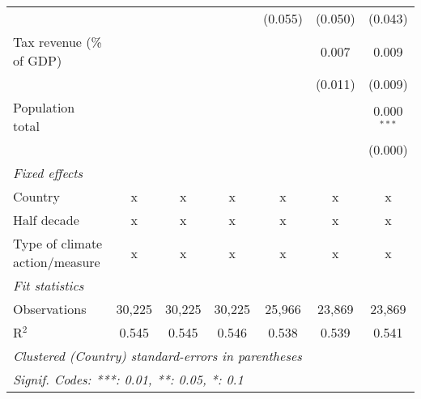 \begin{tabular}{lcccccc}
                                                                     &         &         &               & (0.055)       & (0.050)       & (0.043)\\   
   Tax revenue (\% of GDP)                                           &         &         &               &               & 0.007         & 0.009\\   
                                                                     &         &         &               &               & (0.011)       & (0.009)\\   
   Population total                                                  &         &         &               &               &               & 0.000$^{***}$\\   
                                                                     &         &         &               &               &               & (0.000)\\   
   \emph{Fixed effects}\\
   Country                                                           & x       & x       & x             & x             & x             & x\\  
   Half decade                                                       & x       & x       & x             & x             & x             & x\\  
   Type of climate action/measure                                    & x       & x       & x             & x             & x             & x\\  
   \midrule \emph{Fit statistics}\\
   Observations                                                      & 30,225  & 30,225  & 30,225        & 25,966        & 23,869        & 23,869\\  
   R$^2$                                                             & 0.545   & 0.545   & 0.546         & 0.538         & 0.539         & 0.541\\  
   \midrule
   \multicolumn{7}{l}{\emph{Clustered (Country) standard-errors in parentheses}}\\
   \multicolumn{7}{l}{\emph{Signif. Codes: ***: 0.01, **: 0.05, *: 0.1}}\\
\end{tabular}
\par\endgroup


